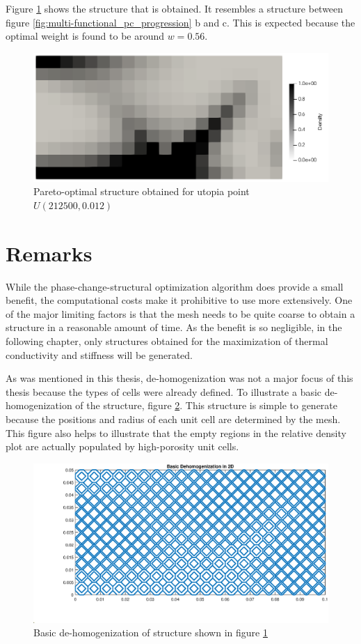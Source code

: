 Figure \ref{fig:pareto_optimal_structure_pc} shows the structure that is obtained. It resembles a structure between figure \ref{fig:multi-functional_pc_progression} b and c. This is expected because the optimal weight is found to be around $w=0.56$.
\begin{figure}[ht]
    \centering
    \includegraphics[width=0.6\linewidth]{figures/chapter_5/ParetoOptimum_PhaseChange.png}
    \caption{Pareto-optimal structure obtained for utopia point $U(212500,0.012)$}
    \label{fig:pareto_optimal_structure_pc}
\end{figure}


\section{Remarks}
While the phase-change-structural optimization algorithm does provide a small benefit, the computational costs make it prohibitive to use more extensively. One of the major limiting factors is that the mesh needs to be quite coarse to obtain a structure in a reasonable amount of time. As the benefit is so negligible, in the following chapter, only structures obtained for the maximization of thermal conductivity and stiffness will be generated.

As was mentioned in this thesis, de-homogenization was not a major focus of this thesis because the types of cells were already defined. To illustrate a basic de-homogenization of the structure, figure \ref{fig:dehomogenized_optimal_pc_structure}. This structure is simple to generate because the positions and radius of each unit cell are determined by the mesh. This figure also helps to illustrate that the empty regions in the relative density plot are actually populated by high-porosity unit cells.
\begin{figure}[ht]
    \centering
    \includegraphics[width=0.7\linewidth]{figures/chapter_5/BasicDehomogenization.eps}
    \caption{Basic de-homogenization of structure shown in figure \ref{fig:pareto_optimal_structure_pc}}
    \label{fig:dehomogenized_optimal_pc_structure}
\end{figure} 